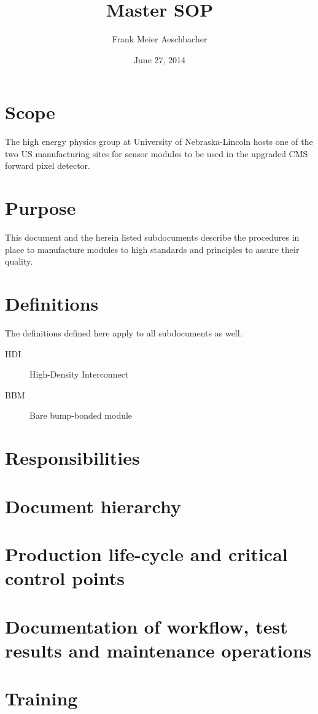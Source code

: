 \documentclass[12pt]{unlsilabsop}
\title{Master SOP}
\date{June 27, 2014}
\author{Frank Meier Aeschbacher}
\begin{document}
\maketitle

\section{Scope}
The high energy physics group at University of Nebraska-Lincoln hosts one of the two US manufacturing sites for sensor modules to be used in the upgraded CMS forward pixel detector. 

\section{Purpose}
This document and the herein listed subdocuments describe the procedures in place to manufacture modules to high standards and principles to assure their quality.

\section{Definitions}
The definitions defined here apply to all subdocuments as well.
\begin{description}
    \item[HDI] High-Density Interconnect
    \item[BBM] Bare bump-bonded module
\end{description}

\section{Responsibilities}

\section{Document hierarchy}

\section{Production life-cycle and critical control points}

\section{Documentation of workflow, test results and maintenance operations}

\section{Training}
\end{document}
